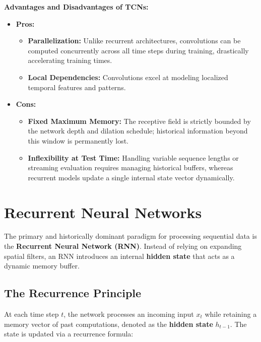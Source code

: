 \begin{InsightBox}
\textbf{Advantages and Disadvantages of TCNs:}
\begin{itemize}[leftmargin=*]
    \item \textbf{Pros:}
    \begin{itemize}[nosep]
        \item \textbf{Parallelization:} Unlike recurrent architectures, convolutions can be computed concurrently across all time steps during training, drastically accelerating training times.
        \item \textbf{Local Dependencies:} Convolutions excel at modeling localized temporal features and patterns.
    \end{itemize}
    \item \textbf{Cons:}
    \begin{itemize}[nosep]
        \item \textbf{Fixed Maximum Memory:} The receptive field is strictly bounded by the network depth and dilation schedule; historical information beyond this window is permanently lost.
        \item \textbf{Inflexibility at Test Time:} Handling variable sequence lengths or streaming evaluation requires managing historical buffers, whereas recurrent models update a single internal state vector dynamically.
    \end{itemize}
\end{itemize}
\end{InsightBox}

\section{Recurrent Neural Networks}

The primary and historically dominant paradigm for processing sequential data is the \textbf{Recurrent Neural Network (RNN)}. Instead of relying on expanding spatial filters, an RNN introduces an internal \textbf{hidden state} that acts as a dynamic memory buffer.

\subsection{The Recurrence Principle}

At each time step $t$, the network processes an incoming input $x_t$ while retaining a memory vector of past computations, denoted as the \textbf{hidden state} $h_{t-1}$. The state is updated via a recurrence formula:

